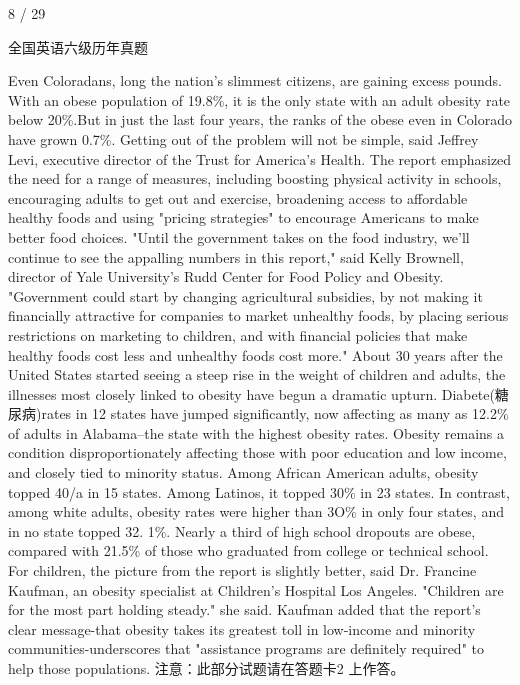 \documentclass[UTF8,11pt]{ctexart}
\begin{document}
8 / 29


全国英语六级历年真题


Even Coloradans, long the nation's slimmest citizens, are gaining excess pounds. With an obese population of 19.8\%, it is the only state with an adult obesity rate below 20\%.But in just the last four years, the ranks of the obese even in Colorado have grown 0.7\%. Getting out of the problem will not be simple, said Jeffrey Levi, executive director of the Trust for America's Health. The report emphasized the need for a range of measures, including boosting physical activity in schools, encouraging adults to get out and exercise, broadening access to affordable healthy foods and using "pricing strategies" to encourage Americans to make better food choices. "Until the government takes on the food industry, we'll continue to see the appalling numbers in this report," said Kelly Brownell, director of Yale University's Rudd Center for Food Policy and Obesity. "Government could start by changing agricultural subsidies, by not making it financially attractive for companies to market unhealthy foods, by placing serious restrictions on marketing to children, and with financial policies that make healthy foods cost less and unhealthy foods cost more." About 30 years after the United States started seeing a steep rise in the weight of children and adults, the illnesses most closely linked to obesity have begun a dramatic upturn. Diabete(糖尿病)rates in 12 states have jumped significantly, now affecting as many as 12.2\% of adults in Alabama--the state with the highest obesity rates. Obesity remains a condition disproportionately affecting those with poor education and low income, and closely tied to minority status. Among African American adults, obesity topped 40/a in 15 states. Among Latinos, it topped 30\% in 23 states. In contrast, among white adults, obesity rates were higher than 3O\% in only four states, and in no state topped 32. 1\%. Nearly a third of high school dropouts are obese, compared with 21.5\% of those who graduated from college or technical school. For children, the picture from the report is slightly better, said Dr. Francine Kaufman, an obesity specialist at Children's Hospital Los Angeles. "Children are for the most part holding steady." she said. Kaufman added that the report's clear message-that obesity takes its greatest toll in low-income and minority communities-underscores that "assistance programs are definitely required" to help those populations. 注意：此部分试题请在答题卡2 上作答。
\end{document}
